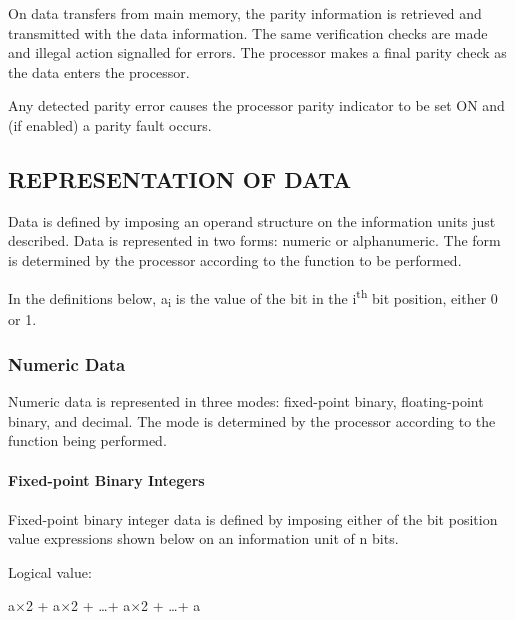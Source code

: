 On data transfers from main memory, the parity information is retrieved and
transmitted with the data information. The same verification checks are made
and illegal action signalled for errors. The processor makes a final parity
check as the data enters the processor.

Any detected parity error causes the processor parity indicator to be set ON
and (if enabled) a parity fault occurs.


\subsection{REPRESENTATION OF DATA}

Data is defined by imposing an operand structure on the information units just
described.  Data is represented in two forms: numeric or alphanumeric. The form
is determined by the processor according to the function to be performed.

In the definitions below, a\textsubscript{i} is the value of the bit in the i\textsuperscript{th} bit
position, either 0 or 1.


\subsubsection{Numeric Data}

Numeric data is represented in three modes: fixed-point binary, floating-point
binary, and decimal. The mode is determined by the processor according to the
function being performed.






\paragraph{Fixed-point Binary Integers}
\paragraph{}
Fixed-point binary integer data is defined by imposing either of the bit
position value expressions shown below on an information unit of n bits.


Logical value:

\hspace{1em}a$\times$2 + a$\times$2 + \ldots + a$\times$2 + \ldots + a

